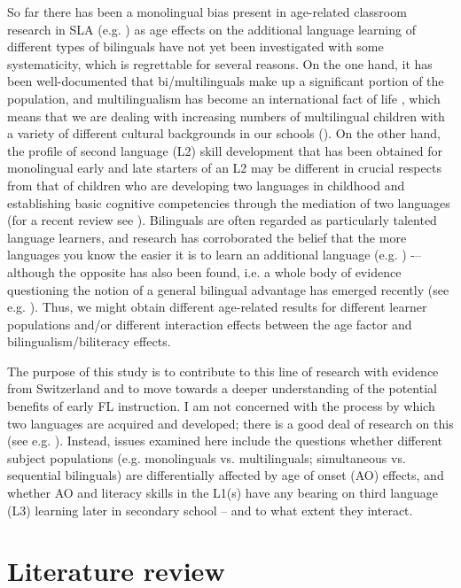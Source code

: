\documentclass[output=paper,modfonts,nonflat,newtxmath]{langsci/langscibook}
\begin{document}
So far there has been a monolingual bias present in age-related classroom research in SLA (e.g. \citealt{GarciaMayoGarciaLecumberri2003, Muñoz2006}) as age effects on the additional language learning of different types of bilinguals have not yet been investigated with some systematicity, which is regrettable for several reasons. On the one hand, it has been well-documented that bi/multilinguals make up a significant portion of the population, and multilingualism has become an international fact of life \citep{Grosjean2010}, which means that we are dealing with increasing numbers of multilingual children with a variety of different cultural backgrounds in our schools (\citealt{MeijerEtAl2003}). On the other hand, the profile of second language (L2) skill development that has been obtained for monolingual early and late starters of an L2 may be different in crucial respects from that of children who are developing two languages in childhood and establishing basic cognitive competencies through the mediation of two languages (for a recent review see \citealt{BialystokEtAl2016}). Bilinguals are often regarded as particularly talented language learners, and research has corroborated the belief that the more languages you know the easier it is to learn an additional language (e.g. \citealt{CenozValencia1994}) -– although the opposite has also been found, i.e. a whole body of evidence questioning the notion of a general bilingual advantage has emerged recently (see e.g. \citealt{deBot2017}). Thus, we might obtain different age-related results for different learner populations and/or different interaction effects between the age factor and bilingualism/biliteracy effects.

The purpose of this study is to contribute to this line of research with evidence from Switzerland and to move towards a deeper understanding of the potential benefits of early FL instruction. I am not concerned with the process by which two languages are acquired and developed; there is a good deal of research on this (see e.g. \citealt{AroninHufeisen2009}). Instead, issues examined here include the questions whether different subject populations (e.g. monolinguals vs. multilinguals; simultaneous vs. sequential bilinguals) are differentially affected by age of onset (AO) effects, and whether AO and literacy skills in the L1(s) have any bearing on third language (L3) learning later in secondary school – and to what extent they interact.

\section{Literature review}
\label{sec:pfenninger:2}
\end{document}
